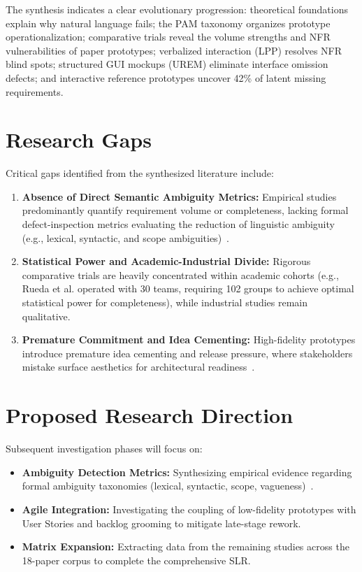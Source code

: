 \documentclass[conference]{IEEEtran}
\begin{document}
The synthesis indicates a clear evolutionary progression: theoretical foundations explain why natural language fails; the PAM taxonomy organizes prototype operationalization; comparative trials reveal the volume strengths and NFR vulnerabilities of paper prototypes; verbalized interaction (LPP) resolves NFR blind spots; structured GUI mockups (UREM) eliminate interface omission defects; and interactive reference prototypes uncover 42\% of latent missing requirements.

\section{Research Gaps}
Critical gaps identified from the synthesized literature include:
\begin{enumerate}
    \item \textbf{Absence of Direct Semantic Ambiguity Metrics:} Empirical studies predominantly quantify requirement volume or completeness, lacking formal defect-inspection metrics evaluating the reduction of linguistic ambiguity (e.g., lexical, syntactic, and scope ambiguities)~\cite{cascon2025ambiguity}.
    \item \textbf{Statistical Power and Academic-Industrial Divide:} Rigorous comparative trials are heavily concentrated within academic cohorts (e.g., Rueda et al. operated with 30 teams, requiring 102 groups to achieve optimal statistical power for completeness), while industrial studies remain qualitative.
    \item \textbf{Premature Commitment and Idea Cementing:} High-fidelity prototypes introduce premature idea cementing and release pressure, where stakeholders mistake surface aesthetics for architectural readiness~\cite{bjarnason2023empirically}.
\end{enumerate}

\section{Proposed Research Direction}
Subsequent investigation phases will focus on:
\begin{itemize}
    \item \textbf{Ambiguity Detection Metrics:} Synthesizing empirical evidence regarding formal ambiguity taxonomies (lexical, syntactic, scope, vagueness)~\cite{cascon2025ambiguity}.
    \item \textbf{Agile Integration:} Investigating the coupling of low-fidelity prototypes with User Stories and backlog grooming to mitigate late-stage rework.
    \item \textbf{Matrix Expansion:} Extracting data from the remaining studies across the 18-paper corpus to complete the comprehensive SLR.
\end{itemize}
\end{document}
